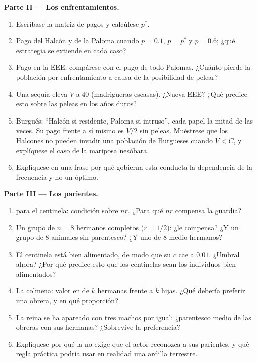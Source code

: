 \begin{problem}
\medskip
\noindent\textbf{Parte II --- Los enfrentamientos.}
\begin{enumerate}[resume]
  \item Escríbase la matriz de pagos y calcúlese $p^{*}$.
  \item Pago del Halcón y de la Paloma cuando $p = 0.1$, $p = p^{*}$ y $p =
        0.6$; ¿qué estrategia se extiende en cada caso?
  \item Pago en la EEE; compárese con el pago de todo Palomas. ¿Cuánto
        pierde la población por enfrentamiento a causa de la posibilidad
        de pelear?
  \item Una sequía eleva $V$ a $40$ (madrigueras escasas). ¿Nueva EEE?
        ¿Qué predice esto sobre las peleas en los años duros?
  \item Burgués: ``Halcón si residente, Paloma si intruso'', cada papel
        la mitad de las veces. Su pago frente a sí mismo es $V/2$ sin
        peleas. Muéstrese que los Halcones no pueden invadir una
        población de Burgueses cuando $V
        < C$, y explíquese el caso de la mariposa nesóbara.
  \item Explíquese en una frase por qué gobierna esta conducta la
        dependencia de la frecuencia y no un óptimo.
\end{enumerate}

\medskip
\noindent\textbf{Parte III --- Los parientes.}
\begin{enumerate}[resume]
  \item {} para el centinela: condición sobre $n\bar r$.
        ¿Para qué $n\bar r$ compensa la guardia?
  \item Un grupo de $n = 8$ hermanos completos ($\bar r = 1/2$): ¿le
        compensa? ¿Y un grupo de 8 animales sin parentesco? ¿Y uno de 8
        medio hermanos?
  \item El centinela está bien alimentado, de modo que su $c$ cae a
        $0.01$. ¿Umbral ahora? ¿Por qué predice esto que los centinelas
        sean los individuos bien alimentados?
  \item La colmena: valor en  de $k$ hermanas frente a
        $k$ hijas. ¿Qué debería preferir una obrera, y en qué
        proporción?
  \item La reina se ha apareado con tres machos por igual: ¿parentesco
        medio de las obreras con sus hermanas? ¿Sobrevive la
        preferencia?
  \item Explíquese por qué la  no exige que el actor
        reconozca a sus parientes, y qué regla práctica podría usar en
        realidad una ardilla terrestre.
\end{enumerate}


\end{problem}
